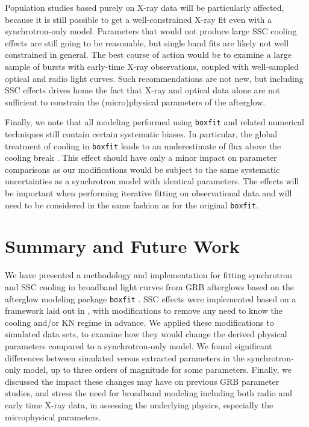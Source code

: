 \documentclass[fleqn,usenatbib]{mnras}
\begin{document}
Population studies based purely on X-ray data will be particularly affected, because it is still possible to get a well-constrained X-ray fit even with a synchrotron-only model. Parameters that would not produce large SSC cooling effects are still going to be reasonable, but single band fits are likely not well constrained in general. The best course of action would be to examine a large sample of bursts with early-time X-ray observations, coupled with well-sampled optical and radio light curves. Such recommendations are not new, but including SSC effects drives home the fact that X-ray and optical data alone are not sufficient to constrain the (micro)physical parameters of the afterglow. 
    
Finally, we note that all modeling performed using \texttt{boxfit} and related numerical techniques still contain certain systematic biases. In particular, the global treatment of cooling in \texttt{boxfit} leads to an underestimate of flux above the cooling break \citep{vezmf10}. This effect should have only a minor impact on parameter comparisons as our modifications would be subject to the same systematic uncertainties as a synchrotron model with identical parameters. The effects will be important when performing iterative fitting on observational data and will need to be considered in the same fashion as for the original \texttt{boxfit}.


\section{Summary and Future Work}\label{sum}

We have presented a methodology and implementation for fitting synchrotron and SSC cooling in broadband light curves from GRB afterglows based on the afterglow modeling package \texttt{boxfit} \citep{vetajvdh}. SSC effects were implemented based on a framework laid out in \citet{Nakar}, with modifications to remove any need to know the cooling and/or KN regime in advance. We applied these modifications to simulated data sets, to examine how they would change the derived physical parameters compared to a synchrotron-only model. We found significant differences between simulated versus extracted parameters in the synchrotron-only model, up to three orders of magnitude for some parameters. Finally, we discussed the impact these changes may have on previous GRB parameter studies, and stress the need for broadband modeling including both radio and early time X-ray data, in assessing the underlying physics, especially the microphysical parameters. 
\end{document}
